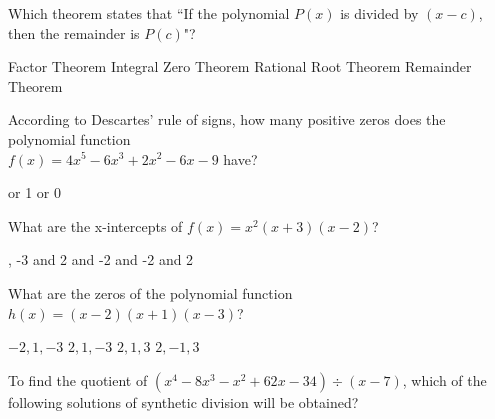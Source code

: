 \begin{questions}
\question Which theorem states that ``If the polynomial $P(x)$ is divided by $(x-c)$, then the remainder is $P(c)$"?   
\begin{multicols}{2}
\begin{choices}  
\choice Factor Theorem 
\choice Integral Zero Theorem
\choice Rational Root Theorem
\CorrectChoice Remainder Theorem
\end{choices}
\end{multicols} 

\question According to Descartes' rule of signs, how many positive zeros does  the polynomial function\\ \mbox{$f(x) = 4x^5-6x^3 + 2x^2-6x-9$} have?
\begin{multicols}{4}
\begin{choices} 
 or 1
 or 0
\end{choices}
\end{multicols} 

\question What are the x-intercepts of $f(x) = x^2 (x +3)(x -2)$?
\begin{multicols}{4}
\begin{choices} 
, -3 and 2
 and -2
 and -2
 and 2
\end{choices}
\end{multicols} 

\question What are the zeros of the polynomial function $h(x) = (x-2) (x + 1) (x-3)$? 
\begin{multicols}{4}
\begin{choices}  
\choice $-2 ,1, -3$ 
\choice $2, 1, - 3$
\choice $2, 1, 3 $
\CorrectChoice $2, - 1, 3$  
\end{choices}
\end{multicols} 

\question To find the quotient of $(x^4-8x^3-x^2+62x-34) \div (x-7)$, which of the following solutions of 
synthetic division will be obtained?  
\begin{multicols}{2}
\end{multicols}
\end{questions}

